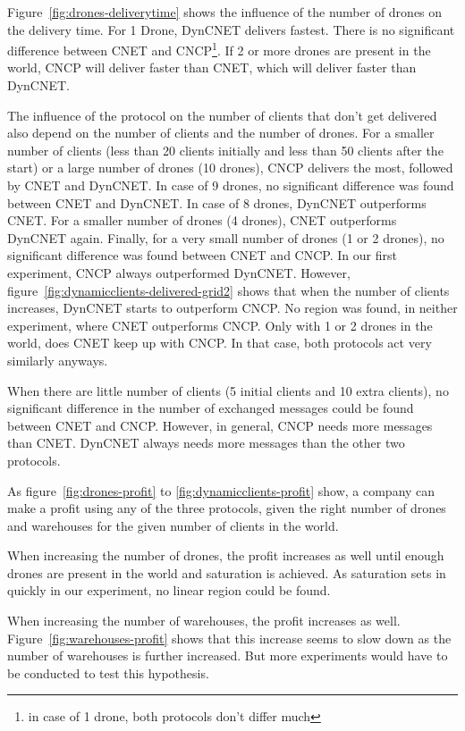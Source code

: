 \documentclass[10pt,a4paper]{article}
\begin{document}
Figure~\ref{fig:drones-deliverytime} shows the influence of the number of drones on the delivery time. For 1 Drone, DynCNET delivers fastest. There is no significant difference between CNET and CNCP\footnote{in case of 1 drone, both protocols don't differ much}. If 2 or more drones are present in the world, CNCP will deliver faster than CNET, which will deliver faster than DynCNET.

The influence of the protocol on the number of clients that don't get delivered also depend on the number of clients and the number of drones. For a smaller number of clients (less than 20 clients initially and less than 50 clients after the start) or a large number of drones (10 drones), CNCP delivers the most, followed by CNET and DynCNET. In case of 9 drones, no significant difference was found between CNET and DynCNET. In case of 8 drones, DynCNET outperforms CNET. For a smaller number of drones (4 drones), CNET outperforms DynCNET again. Finally, for a very small number of drones (1 or 2 drones), no significant difference was found between CNET and CNCP. In our first experiment, CNCP always outperformed DynCNET. However, figure~\ref{fig:dynamicclients-delivered-grid2} shows that when the number of clients increases, DynCNET starts to outperform CNCP. No region was found, in neither experiment, where CNET outperforms CNCP. Only with 1 or 2 drones in the world, does CNET keep up with CNCP. In that case, both protocols act very similarly anyways.

When there are little number of clients (5 initial clients and 10 extra clients), no significant difference in the number of exchanged messages could be found between CNET and CNCP. However, in general, CNCP needs more messages than CNET. DynCNET always needs more messages than the other two protocols.

As figure~\ref{fig:drones-profit} to \ref{fig:dynamicclients-profit} show, a company can make a profit using any of the three protocols, given the right number of drones and warehouses for the given number of clients in the world.

When increasing the number of drones, the profit increases as well until enough drones are present in the world and saturation is achieved. As saturation sets in quickly in our experiment, no linear region could be found.

When increasing the number of warehouses, the profit increases as well. Figure~\ref{fig:warehouses-profit} shows that this increase seems to slow down as the number of warehouses is further increased. But more experiments would have to be conducted to test this hypothesis. 
\end{document}
